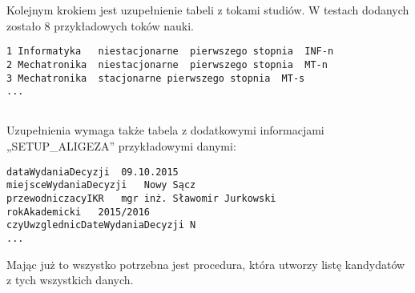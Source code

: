 Kolejnym krokiem jest uzupełnienie tabeli z tokami studiów. W testach dodanych zostało 8 przykładowych toków nauki. 

\begin{lstlisting}
1 Informatyka	niestacjonarne	pierwszego stopnia	INF-n				
2 Mechatronika	niestacjonarne	pierwszego stopnia	MT-n				
3 Mechatronika	stacjonarne	pierwszego stopnia	MT-s				
...


\end{lstlisting}
Uzupełnienia wymaga także tabela z dodatkowymi informacjami „SETUP\_ALIGEZA” przykładowymi danymi:
\begin{lstlisting}
dataWydaniaDecyzji	09.10.2015
miejsceWydaniaDecyzji	Nowy Sącz
przewodniczacyIKR	mgr inż. Sławomir Jurkowski
rokAkademicki	2015/2016
czyUwzglednicDateWydaniaDecyzji	N
...

\end{lstlisting}

Mając już to wszystko potrzebna jest procedura, która utworzy listę kandydatów z tych wszystkich danych. 

